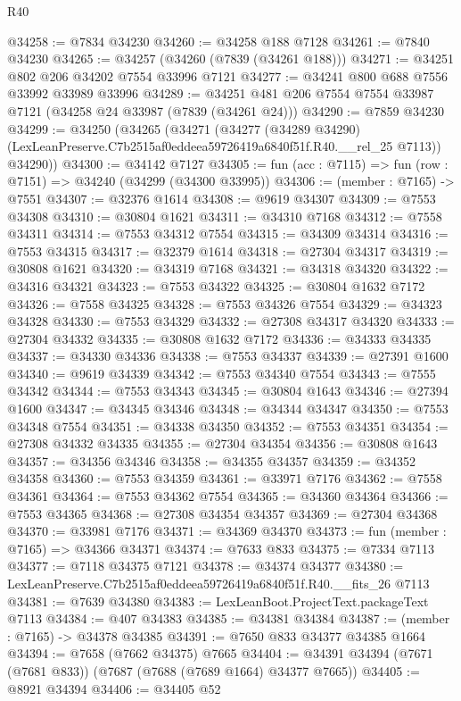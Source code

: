 \begin{lexlean}{R40}
\begin{coremodule}
@34258 := @7834 @34230
@34260 := @34258 @188 @7128
@34261 := @7840 @34230
@34265 := @34257 (@34260 (@7839 (@34261 @188)))
@34271 := @34251 @802 @206 @34202 @7554 @33996 @7121
@34277 := @34241 @800 @688 @7556 @33992 @33989 @33996
@34289 := @34251 @481 @206 @7554 @7554 @33987 @7121 (@34258 @24 @33987 (@7839 (@34261 @24)))
@34290 := @7859 @34230
@34299 := @34250
    (@34265
      (@34271
        (@34277
          (@34289 @34290)
          (LexLeanPreserve.C7b2515af0eddeea59726419a6840f51f.R40.__rel_25 @7113))
        @34290))
@34300 := @34142 @7127
@34305 := fun (acc : @7115) => fun (row : @7151) => @34240 (@34299 (@34300 @33995))
@34306 := (member : @7165) -> @7551
@34307 := @32376 @1614
@34308 := @9619 @34307
@34309 := @7553 @34308
@34310 := @30804 @1621
@34311 := @34310 @7168
@34312 := @7558 @34311
@34314 := @7553 @34312 @7554
@34315 := @34309 @34314
@34316 := @7553 @34315
@34317 := @32379 @1614
@34318 := @27304 @34317
@34319 := @30808 @1621
@34320 := @34319 @7168
@34321 := @34318 @34320
@34322 := @34316 @34321
@34323 := @7553 @34322
@34325 := @30804 @1632 @7172
@34326 := @7558 @34325
@34328 := @7553 @34326 @7554
@34329 := @34323 @34328
@34330 := @7553 @34329
@34332 := @27308 @34317 @34320
@34333 := @27304 @34332
@34335 := @30808 @1632 @7172
@34336 := @34333 @34335
@34337 := @34330 @34336
@34338 := @7553 @34337
@34339 := @27391 @1600
@34340 := @9619 @34339
@34342 := @7553 @34340 @7554
@34343 := @7555 @34342
@34344 := @7553 @34343
@34345 := @30804 @1643
@34346 := @27394 @1600
@34347 := @34345 @34346
@34348 := @34344 @34347
@34350 := @7553 @34348 @7554
@34351 := @34338 @34350
@34352 := @7553 @34351
@34354 := @27308 @34332 @34335
@34355 := @27304 @34354
@34356 := @30808 @1643
@34357 := @34356 @34346
@34358 := @34355 @34357
@34359 := @34352 @34358
@34360 := @7553 @34359
@34361 := @33971 @7176
@34362 := @7558 @34361
@34364 := @7553 @34362 @7554
@34365 := @34360 @34364
@34366 := @7553 @34365
@34368 := @27308 @34354 @34357
@34369 := @27304 @34368
@34370 := @33981 @7176
@34371 := @34369 @34370
@34373 := fun (member : @7165) => @34366 @34371
@34374 := @7633 @833
@34375 := @7334 @7113
@34377 := @7118 @34375 @7121
@34378 := @34374 @34377
@34380 := LexLeanPreserve.C7b2515af0eddeea59726419a6840f51f.R40.__fits_26 @7113
@34381 := @7639 @34380
@34383 := LexLeanBoot.ProjectText.packageText @7113
@34384 := @407 @34383
@34385 := @34381 @34384
@34387 := (member : @7165) -> @34378 @34385
@34391 := @7650 @833 @34377 @34385 @1664
@34394 := @7658 (@7662 @34375) @7665
@34404 := @34391 @34394 (@7671 (@7681 @833)) (@7687 (@7688 (@7689 @1664) @34377 @7665))
@34405 := @8921 @34394
@34406 := @34405 @52

\end{coremodule}
\end{lexlean}
